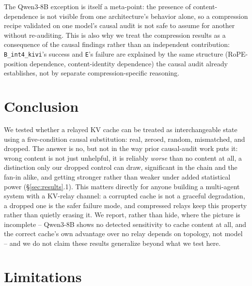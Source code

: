 \documentclass[11pt]{article}
\begin{document}
The Qwen3-8B exception is itself a meta-point: the presence of
content-dependence is not visible from one architecture's behavior
alone, so a compression recipe validated on one model's causal audit is
not safe to assume for another without re-auditing. This is also why we
treat the
compression results as a consequence of the causal findings rather than
an independent contribution: \texttt{B\_int4\_kivi}'s success and
\texttt{E}'s failure are explained by the same structure (RoPE-position
dependence, content-identity dependence) the causal audit already
establishes, not by separate compression-specific reasoning.

\section{Conclusion}

We tested whether a relayed KV cache can be treated as interchangeable
state using a five-condition causal substitution: real, zeroed,
random, mismatched, and dropped. The answer is no, but not in the way
prior causal-audit work puts it: wrong content is not just unhelpful,
it is reliably \emph{worse} than no content at all, a distinction only
our dropped control can draw, significant in the chain and the fan-in
alike, and getting stronger rather than weaker under added statistical
power (\S\ref{sec:results}.1). This matters directly for anyone
building a multi-agent system with a KV-relay channel: a corrupted
cache is not a graceful degradation, a dropped one is the safer failure
mode, and compressed relays keep this property rather than quietly
erasing it. We report, rather than hide, where the picture is
incomplete -- Qwen3-8B shows no detected sensitivity to cache content
at all, and the correct cache's own advantage over no relay depends on
topology, not model -- and we do not claim these results generalize
beyond what we test here.

\section{Limitations}
\label{sec:limitations}
\end{document}
